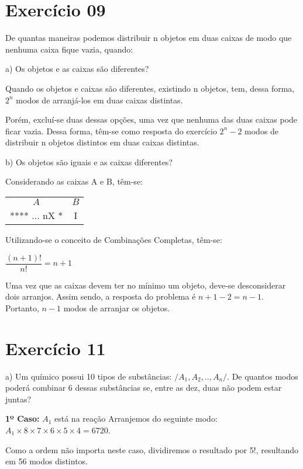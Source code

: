 \documentclass[12pt]{article}
\begin{document}
\section*{Exercício 09}

De quantas maneiras podemos distribuir n objetos em duas caixas de modo que nenhuma caixa fique vazia, quando:

\bigskip

a) Os objetos e as caixas são diferentes?

Quando os objetos e caixas são diferentes, existindo n objetos, tem, dessa forma, $2^n$ modos de arranjá-los em duas caixas distintas.

Porém, excluí-se duas dessas opções, uma vez que nenhuma das duas caixas pode ficar vazia. Dessa forma, têm-se como resposta do exercício $2^n-2$ modos de distribuir n objetos distintos em duas caixas distintas. 

\bigskip

b) Os objetos são iguais e as caixas diferentes?

Considerando as caixas A e B, têm-se:

\begin{tabular}{cc}
	$A$ & $B$ \\ 
	**** ... nX * & I \\ 
\end{tabular} 
   
Utilizando-se o conceito de Combinações Completas, têm-se: \medskip

$\displaystyle \dfrac{(n+1)!}{n!}=n+1$ \medskip

Uma vez que as caixas devem ter no mínimo um objeto, deve-se desconsiderar dois arranjos. Assim sendo, a resposta do problema é $n+1-2=n-1$. Portanto, $n-1$ modos de arranjar os objetos.

\section*{Exercício 11}

a) Um químico possui 10 tipos de substâncias: $/{A_1, A_2, .., A_n/}$. De quantos modos poderá combinar 6 dessas substâncias se, entre as dez, duas não podem estar juntas?

\textbf{1º Caso:} $A_1$ está na reação
Arranjemos do seguinte modo:
$A_1 \times 8 \times 7 \times 6 \times 5 \times 4 = 6720$.

Como a ordem não importa neste caso, dividiremos o resultado por 5!, resultando em 56 modos distintos.
\end{document}
